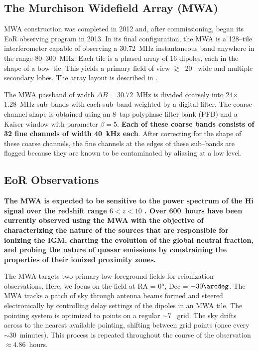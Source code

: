 \documentclass[preprint2,iop,numberedappendix]{emulateapj}
\begin{document}
\subsection{The Murchison Widefield Array (MWA)}\label{sec:instrument}

MWA construction was completed in 2012 and, after commissioning, began its EoR observing program in 2013. In its final configuration, the MWA is a 128--tile interferometer capable of observing a 30.72~MHz instantaneous band anywhere in the range 80--300~MHz. Each tile is a phased array of 16 dipoles, each in the shape of a bow--tie. This yields a primary field of view $\gtrsim$~20\arcdeg~ wide and multiple secondary lobes. The array layout is described in \citet{bea12}. %

The MWA passband of width $\Delta B=30.72$~MHz is divided coarsely into 24$\times$1.28~MHz sub--bands with each sub--band weighted by a digital filter. The coarse channel shape is obtained using an 8--tap polyphase filter bank (PFB) and a Kaiser window with parameter $\beta=5$. {\bf Each of these coarse bands consists of 32 fine channels of width 40~kHz each}. After correcting for the shape of these coarse channels, the fine channels at the edges of these sub--bands are flagged because they are known to be contaminated by aliasing at a low level. %

\subsection{EoR Observations}\label{sec:obsparms}

{\bf The MWA is expected to be sensitive to the power spectrum of the H{\sc i} signal over the redshift range $6<z<10$ \citep{bow06,thy13,bea13}. Over 600~hours have been currently observed using the MWA with the objective of characterizing the nature of the sources that are responsible for ionizing the IGM, charting the evolution of the global neutral fraction, and probing the nature of quasar emissions by constraining the properties of their ionized proximity zones.}

The MWA targets two primary low-foreground fields for reionization observations. Here, we focus on the field at RA = 0$^\textrm{h}$, Dec = $-30\arcdeg$. The MWA tracks a patch of sky through antenna beams formed and steered electronically by controlling delay settings of the dipoles in an MWA tile. The pointing system is optimized to points on a regular $\sim$7\arcdeg~ grid. The sky drifts across to the nearest available pointing, shifting between grid points (once every $\sim 30$~minutes). This process is repeated throughout the course of the observation $\approx 4.86$~hours. 
\end{document}
